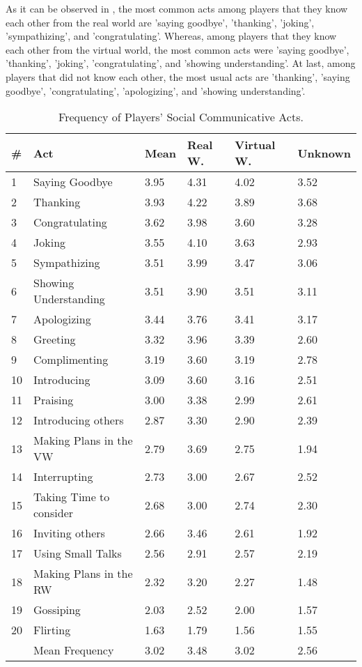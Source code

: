 \documentclass[english]{textolivre}
\begin{document}
As it can be observed in ,  the most common acts among players that they know each other from the real world are 'saying goodbye', 'thanking', 'joking', 'sympathizing’, and 'congratulating’. Whereas, among players that they know each other from the virtual world, the most common acts were 'saying goodbye', 'thanking', 'joking', 'congratulating', and 'showing understanding'. At last, among players that did not know each other, the most usual acts are 'thanking', 'saying goodbye', 'congratulating', 'apologizing', and 'showing understanding'.

\begin{table}[htpb]
\caption{Frequency of Players’ Social Communicative Acts.}
\label{figure2}
\centering
\begin{tabular}{p{}p{}p{}p{}p{}p{}}
\toprule 
\# & Act & Mean & Real W. & Virtual W. & Unknown
\\ 
\midrule
1 & Saying Goodbye & 3.95 & 4.31 & 4.02 & 3.52
\\
2 & Thanking & 3.93 & 4.22 & 3.89 & 3.68
\\
3 & Congratulating & 3.62 & 3.98 & 3.60 & 3.28
\\
4 & Joking & 3.55 & 4.10 & 3.63 & 2.93
\\
5 & Sympathizing & 3.51 & 3.99 & 3.47 & 3.06
\\
6 & Showing Understanding & 3.51 & 3.90 & 3.51 & 3.11
\\
7 & Apologizing & 3.44 & 3.76 & 3.41 & 3.17
\\
8 & Greeting & 3.32 & 3.96 & 3.39 & 2.60
\\
9 & Complimenting & 3.19 & 3.60 & 3.19 & 2.78
\\
10 & Introducing & 3.09 & 3.60 & 3.16 & 2.51
\\
11 & Praising & 3.00 & 3.38 & 2.99 & 2.61
\\
12 & Introducing others & 2.87 & 3.30 & 2.90 & 2.39
\\
13 & Making Plans in the VW & 2.79 & 3.69 & 2.75 & 1.94
\\
14 & Interrupting & 2.73 & 3.00 & 2.67 & 2.52
\\
15 & Taking Time to consider & 2.68 & 3.00 & 2.74 & 2.30
\\
16 & Inviting others & 2.66 & 3.46 & 2.61 & 1.92
\\
17 & Using Small Talks & 2.56 & 2.91 & 2.57 & 2.19
\\
18 & Making Plans in the RW & 2.32 & 3.20 & 2.27 & 1.48
\\
19 & Gossiping & 2.03 & 2.52 & 2.00 & 1.57
\\
20 & Flirting & 1.63 & 1.79 & 1.56 & 1.55
\\ 
\midrule
& Mean Frequency & 3.02 & 3.48 & 3.02 & 2.56
\\
\bottomrule
\end{tabular}
\end{table}
\end{document}
